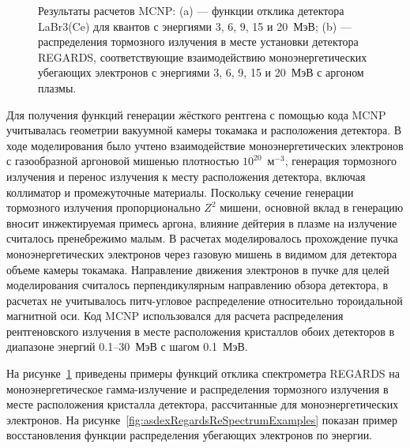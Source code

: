 \begin{figure}[ht!]
  \caption{ Результаты расчетов MCNP: (a) --- функции отклика детектора LaBr3(Ce) для квантов с энергиями 3, 6, 9, 15 и 20~МэВ; (b) --- распределения тормозного излучения в месте установки детектора REGARDS, соответствующие взаимодействию моноэнергетических убегающих электронов с энергиями 3, 6, 9, 15 и 20~МэВ с аргоном плазмы.~\cite{Shevelev2021} }
  \label{fig:asdexRegardsResponses}
\end{figure}

Для получения функций генерации жёсткого рентгена с помощью кода MCNP учитывалась геометрии вакуумной камеры токамака и расположения детектора. В ходе моделирования было учтено взаимодействие моноэнергетических электронов с газообразной аргоновой мишенью плотностью $10^{20}$~м${}^{-3}$, генерация тормозного излучения и перенос излучения к месту расположения детектора, включая коллиматор и промежуточные материалы. Поскольку сечение генерации тормозного излучения пропорционально $Z^2$ мишени, основной вклад в генерацию вносит инжектируемая примесь аргона, влияние дейтерия в плазме на излучение считалось пренебрежимо малым. В расчетах моделировалось прохождение пучка моноэнергетических электронов через газовую мишень в видимом для детектора объеме камеры токамака. Направление движения электронов в пучке для целей моделирования считалось перпендикулярным направлению обзора детектора, в расчетах не учитывалось питч-угловое распределение относительно тороидальной магнитной оси. Код MCNP использовался для расчета распределения рентгеновского излучения в месте расположения кристаллов обоих детекторов в диапазоне энергий 0.1--30~МэВ с шагом 0.1~МэВ.~\cite{Shevelev2021} 

На рисунке~\ref{fig:asdexRegardsResponses} приведены примеры функций отклика спектрометра REGARDS на моноэнергетическое гамма-излучение и распределения тормозного излучения в месте расположения кристалла детектора, рассчитанные для моноэнергетических электронов. На рисунке~\ref{fig:asdexRegardsReSpectrumExamples} показан пример восстановления функции распределения убегающих электронов по энергии.~\cite{Shevelev2021}

